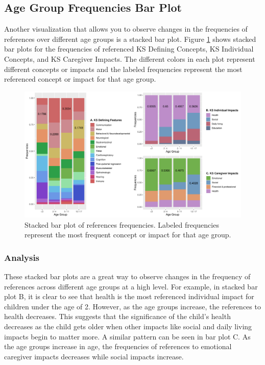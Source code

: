 \documentclass[
]{article}
\begin{document}
\hypertarget{age-group-frequencies-bar-plot}{%
\subsection{Age Group Frequencies Bar Plot}\label{age-group-frequencies-bar-plot}}

Another visualization that allows you to observe changes in the frequencies of references over different age groups is a stacked bar plot. Figure \ref{fig:stacked-plot} shows stacked bar plots for the frequencies of referenced KS Defining Concepts, KS Individual Concepts, and KS Caregiver Impacts. The different colors in each plot represent different concepts or impacts and the labeled frequencies represent the most referenced concept or impact for that age group.

\begin{figure}
\centering
\includegraphics{Report_files/figure-latex/stacked-plot-1.pdf}
\caption{\label{fig:stacked-plot}Stacked bar plot of references frequencies. Labeled frequencies represent the most frequent concept or impact for that age group.}
\end{figure}

\hypertarget{analysis-2}{%
\subsubsection{Analysis}\label{analysis-2}}

These stacked bar plots are a great way to observe changes in the frequency of references across different age groups at a high level. For example, in stacked bar plot B, it is clear to see that health is the most referenced individual impact for children under the age of 2. However, as the age groups increase, the references to health decreases. This suggests that the significance of the child's health decreases as the child gets older when other impacts like social and daily living impacts begin to matter more. A similar pattern can be seen in bar plot C. As the age groups increase in age, the frequencies of references to emotional caregiver impacts decreases while social impacts increase.
\end{document}
